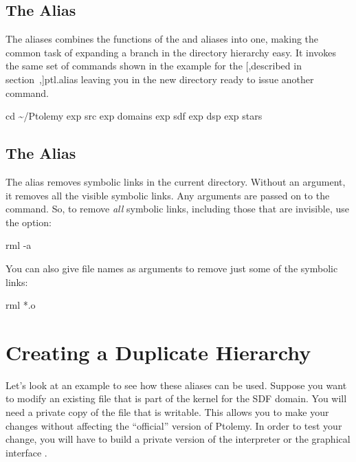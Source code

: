 \subsection{The \protect{} Alias}
The  aliases combines the functions of the  and
 aliases into one, making the common task of expanding a
branch in the directory hierarchy easy.  It invokes the same set of
commands shown in the example for the
[,described in section~\Ref,]{ptl.alias}
leaving you in the new directory ready to issue another 
command.
\begin{example}
cd \sim{}/Ptolemy
exp src
exp domains
exp sdf
exp dsp
exp stars
\end{example}

\subsection{The \protect{} Alias}
The  alias removes symbolic links in the current directory.
Without an argument, it removes all the visible symbolic links.  Any
arguments are passed on to the  command.  So, to remove
\emph{all} symbolic links, including those that are invisible, use the
 option:
\begin{example}
rml -a
\end{example}
You can also give file names as arguments to remove just some of the symbolic
links:
\begin{example}
rml *.o
\end{example}

\section{Creating a Duplicate Hierarchy}

Let's look at an example to see how these aliases can be used.  Suppose
you want to modify an existing file that is part of the kernel for the
SDF domain.  You will need a private copy of the file that is
writable.  This allows you to make your changes without affecting the
``official'' version of Ptolemy.  In order to test your change, you
will have to build a private version of the interpreter  or
the graphical interface .

